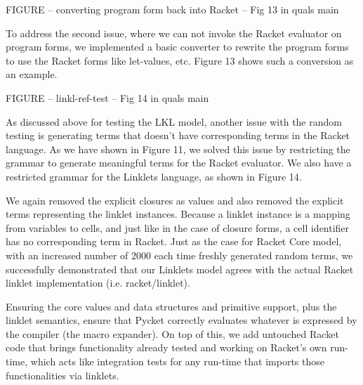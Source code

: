			\begin{figure-here}
				FIGURE -- converting program form back into Racket -- Fig 13 in quals main
			\end{figure-here}

			\begin{paragraph-here}%
				To address the second issue, where we can not invoke the Racket evaluator on program forms, we implemented a basic converter to rewrite the program forms to use the Racket forms like let-values, etc. Figure 13 shows such a conversion as an example.

			\end{paragraph-here}

			\begin{figure-here}
				 FIGURE -- linkl-ref-test -- Fig 14 in quals main
			\end{figure-here}

			\begin{paragraph-here}%
				As discussed above for testing the LKL model, another issue with the random testing is generating terms that doesn’t have corresponding terms in the Racket language. As we have shown in Figure 11, we solved this issue by restricting the grammar to generate meaningful terms for the Racket evaluator. We also have a restricted grammar for the Linklets language, as shown in Figure 14.
			\end{paragraph-here}

			\begin{paragraph-here}%
				We again removed the explicit closures as values and also removed the explicit terms representing the linklet instances. Because a linklet instance is a mapping from variables to cells, and just like in the case of closure forms, a cell identifier has no corresponding term in Racket. Just as the case for Racket Core model, with an increased number of 2000 each time freshly generated random terms, we successfully demonstrated that our Linklets model agrees with the actual Racket linklet implementation (i.e. racket/linklet).
			\end{paragraph-here}

			\begin{paragraph-here}%
				Ensuring the core values and data structures and primitive support, plus the linklet semantics, ensure that Pycket correctly evaluates whatever is expressed by the compiler (the macro expander). On top of this, we add untouched Racket code that brings functionality already tested and working on Racket's own run-time, which acts like integration tests for any run-time that imports those functionalities via linklets.
			\end{paragraph-here}


